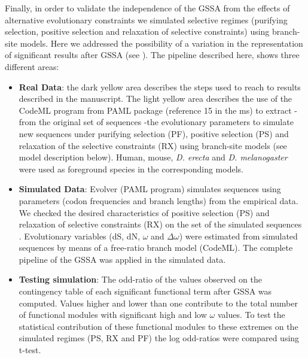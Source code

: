Finally, in order to validate the independence of the GSSA from the effects of alternative evolutionary constraints we simulated selective regimes (purifying selection, positive selection and relaxation of selective constraints) using branch-site models. Here we addressed the possibility of a variation in the representation of significant results after GSSA (see ). The pipeline described here, shows three different areas: 
\begin{itemize}
\item \textbf{Real Data}: the dark yellow area describes the steps used to reach to results described in the manuscript. The light yellow area describes the use of the CodeML program from PAML package (reference 15 in the ms) to extract -from the original set of sequences -the evolutionary parameters to simulate new sequences under purifying selection (PF), positive selection (PS) and relaxation of the selective constraints (RX) using branch-site models (see model description below). Human, mouse, \textit{D. erecta} and \textit{D. melanogaster} were used as foreground species in the corresponding models.
\item \textbf{Simulated Data}: Evolver (PAML program) simulates sequences using parameters (codon frequencies and branch lengths) from the empirical data. We checked the desired characteristics of positive selection (PS) and relaxation of selective constraints (RX) on the set of the simulated sequences . Evolutionary variables (dS, dN, $\omega$ and $\Delta\omega$) were estimated from simulated sequences by means of a free-ratio branch model (CodeML). The complete pipeline of the GSSA was applied in the simulated data.
\item \textbf{Testing simulation}: The odd-ratio of the values observed on the contingency table of each significant functional term after GSSA was computed. Values higher and lower than one contribute to the total number of functional modules with significant high and low $\omega$ values. To test the statistical contribution of these functional modules to these extremes on the simulated regimes (PS, RX and PF) the log odd-ratios were compared using t-test.
\end{itemize}

